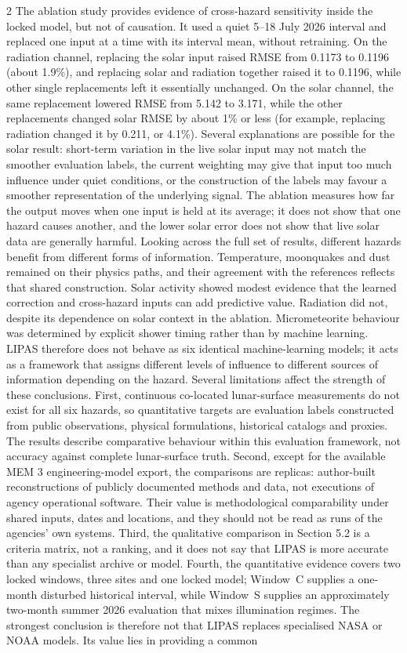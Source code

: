\begin{multicols}{2}
The ablation study provides evidence of cross-hazard sensitivity inside the locked model, but not of causation. It used a quiet 5--18 July 2026 interval and replaced one input at a time with its interval mean, without retraining. On the radiation channel, replacing the solar input raised RMSE from 0.1173 to 0.1196 (about 1.9\%), and replacing solar and radiation together raised it to 0.1196, while other single replacements left it essentially unchanged. On the solar channel, the same replacement lowered RMSE from 5.142 to 3.171, while the other replacements changed solar RMSE by about 1\% or less (for example, replacing radiation changed it by 0.211, or 4.1\%). Several explanations are possible for the solar result: short-term variation in the live solar input may not match the smoother evaluation labels, the current weighting may give that input too much influence under quiet conditions, or the construction of the labels may favour a smoother representation of the underlying signal. The ablation measures how far the output moves when one input is held at its average; it does not show that one hazard causes another, and the lower solar error does not show that live solar data are generally harmful. Looking across the full set of results, different hazards benefit from different forms of information. Temperature, moonquakes and dust remained on their physics paths, and their agreement with the references reflects that shared construction. Solar activity showed modest evidence that the learned correction and cross-hazard inputs can add predictive value. Radiation did not, despite its dependence on solar context in the ablation. Micrometeorite behaviour was determined by explicit shower timing rather than by machine learning. LIPAS therefore does not behave as six identical machine-learning models; it acts as a framework that assigns different levels of influence to different sources of information depending on the hazard. Several limitations affect the strength of these conclusions. First, continuous co-located lunar-surface measurements do not exist for all six hazards, so quantitative targets are evaluation labels constructed from public observations, physical formulations, historical catalogs and proxies. The results describe comparative behaviour within this evaluation framework, not accuracy against complete lunar-surface truth. Second, except for the available MEM 3 engineering-model export, the comparisons are replicas: author-built reconstructions of publicly documented methods and data, not executions of agency operational software. Their value is methodological comparability under shared inputs, dates and locations, and they should not be read as runs of the agencies' own systems. Third, the qualitative comparison in Section 5.2 is a criteria matrix, not a ranking, and it does not say that LIPAS is more accurate than any specialist archive or model. Fourth, the quantitative evidence covers two locked windows, three sites and one locked model; Window~C supplies a one-month disturbed historical interval, while Window~S supplies an approximately two-month summer 2026 evaluation that mixes illumination regimes. The strongest conclusion is therefore not that LIPAS replaces specialised NASA or NOAA models. Its value lies in providing a common 
\end{multicols}
